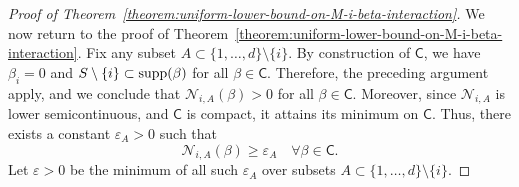 \documentclass[sn-mathphys-num]{sn-jnl}%
\numberwithin{equation}{section}
\newcommand{\R}{\mathbb{R}}
\newcommand{\E}{\mathbb{E}}
\newcommand{\norm}[1]{\left\|{#1}\right\|} %
\newtheorem{lemma}{Lemma}
\newcommand{\profile}{\psi}
\newcommand{\supp}{\mathop{\rm supp}}
\theoremstyle{thmstyleone}%
\theoremstyle{thmstyletwo}%
\theoremstyle{thmstylethree}%
\begin{document}
\begin{proof}[Proof of Theorem~\ref{theorem:uniform-lower-bound-on-M-i-beta-interaction}]

We now return to the proof of Theorem~\ref{theorem:uniform-lower-bound-on-M-i-beta-interaction}. Fix any subset $A \subset \{1, \dots, d\} \setminus \{i\}$. By construction of $\mathsf{C}$, we have $\beta_i = 0$ and $S \setminus \{i\} \subset \supp(\beta)$ for all $\beta \in \mathsf{C}$. Therefore, the preceding argument apply, and we conclude that $\mathcal{N}_{i,A}(\beta) > 0$ for all $\beta \in \mathsf{C}$. Moreover, since $\mathcal{N}_{i,A}$ is lower semicontinuous, and $\mathsf{C}$ is compact, it attains its minimum on $\mathsf{C}$. Thus, there exists a constant $\varepsilon_A > 0$ such that
\[
\mathcal{N}_{i, A}(\beta) \ge \varepsilon_A \quad \forall \beta \in \mathsf{C}.
\]
Let $\varepsilon > 0$ be the minimum of all such $\varepsilon_A$ over subsets $A \subset \{1, \dots, d\} \setminus \{i\}$. 


\end{proof}
\end{document}
